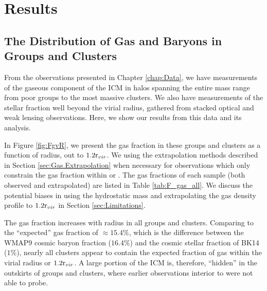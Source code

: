 \chapter{Results}
\label{chap:Results}

\section{The Distribution of Gas and Baryons in Groups and Clusters}
\label{sec:Spatial}

From the observations presented in Chapter \ref{chap:Data}, we have
measurements of the gaseous component of the ICM in halos spanning the
entire mass range from poor groups to the most massive clusters. We
also have measurements of the stellar fraction well beyond the
virial radius, gathered from stacked optical and weak lensing
observations. Here, we show our results from this data and its
analysis.

In Figure \ref{fig:FgvR}, we present the gas fraction in these groups
and clusters as a function of radius, out to $1.2\textrm{r\ensuremath{_{vir}}}{}$. We using
the extrapolation methods described in Section
\ref{sec:Gas.Extrapolation} when necessary for observations which only
constrain the gas fraction within \rfive{} or \rtwo{}. The gas
fractions of each sample (both observed and extrapolated) are listed
in Table \ref{tab:F_gas_all}. We discuss the potential biases in using
the hydrostatic mass and extrapolating the gas density profile to
$1.2\textrm{r\ensuremath{_{vir}}}$ in Section \ref{sec:Limitations}.


\afterpage{\clearpage}

The gas fraction increases with radius in all groups and
clusters. Comparing to the ``expected'' gas fraction of $\approx
15.4\%$, which is the difference between the WMAP9 cosmic baryon
fraction ($16.4\%$) and the cosmic stellar fraction of BK14 ($1\%$),
nearly all clusters appear to contain the expected fraction of gas
within the virial radius or $1.2\textrm{r\ensuremath{_{vir}}}$. A large portion of the ICM is,
therefore, ``hidden'' in the outskirts of groups and clusters, where
earlier observations interior to \rfive{} were not able to probe.

 

